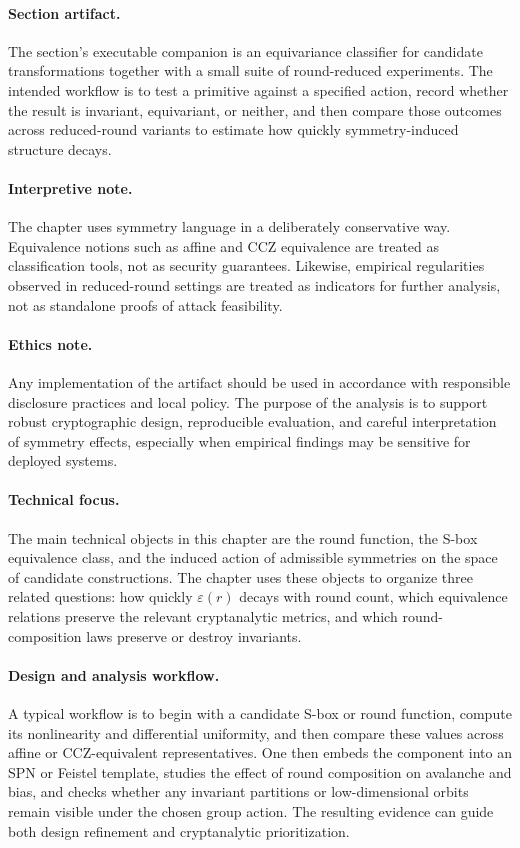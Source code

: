 \documentclass[11pt]{article}
\begin{document}
\paragraph{Section artifact.} The section's executable companion is an equivariance classifier for candidate transformations together with a small suite of round-reduced experiments. The intended workflow is to test a primitive against a specified action, record whether the result is invariant, equivariant, or neither, and then compare those outcomes across reduced-round variants to estimate how quickly symmetry-induced structure decays.

\paragraph{Interpretive note.} The chapter uses symmetry language in a deliberately conservative way. Equivalence notions such as affine and CCZ equivalence are treated as classification tools, not as security guarantees. Likewise, empirical regularities observed in reduced-round settings are treated as indicators for further analysis, not as standalone proofs of attack feasibility.

\paragraph{Ethics note.} Any implementation of the artifact should be used in accordance with responsible disclosure practices and local policy. The purpose of the analysis is to support robust cryptographic design, reproducible evaluation, and careful interpretation of symmetry effects, especially when empirical findings may be sensitive for deployed systems.

\paragraph{Technical focus.} The main technical objects in this chapter are the round function, the S-box equivalence class, and the induced action of admissible symmetries on the space of candidate constructions. The chapter uses these objects to organize three related questions: how quickly \(\varepsilon(r)\) decays with round count, which equivalence relations preserve the relevant cryptanalytic metrics, and which round-composition laws preserve or destroy invariants.

\paragraph{Design and analysis workflow.} A typical workflow is to begin with a candidate S-box or round function, compute its nonlinearity and differential uniformity, and then compare these values across affine or CCZ-equivalent representatives. One then embeds the component into an SPN or Feistel template, studies the effect of round composition on avalanche and bias, and checks whether any invariant partitions or low-dimensional orbits remain visible under the chosen group action. The resulting evidence can guide both design refinement and cryptanalytic prioritization.
\end{document}
